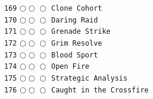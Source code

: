 \documentclass[a4paper,landscape]{article}
\begin{document}
\begin{multicols*}{5}
\texttt{169} \(\bigcirc\!\bigcirc\!\bigcirc\)  \texttt{Clone Cohort} \vspace{-0.3mm}\\ 
\texttt{170} \(\bigcirc\!\bigcirc\!\bigcirc\)  \texttt{Daring Raid} \vspace{-0.3mm}\\ 
\texttt{171} \(\bigcirc\!\bigcirc\!\bigcirc\)  \texttt{Grenade Strike} \vspace{-0.3mm}\\ 
\texttt{172} \(\bigcirc\!\bigcirc\!\bigcirc\)  \texttt{Grim Resolve} \vspace{-0.3mm}\\ 
\texttt{173} \(\bigcirc\!\bigcirc\!\bigcirc\)  \texttt{Blood Sport} \vspace{-0.3mm}\\ 
\texttt{174} \(\bigcirc\!\bigcirc\!\bigcirc\)  \texttt{Open Fire} \vspace{-0.3mm}\\ 
\texttt{175} \(\bigcirc\!\bigcirc\!\bigcirc\)  \texttt{Strategic Analysis} \vspace{-0.3mm}\\ 
\texttt{176} \(\bigcirc\!\bigcirc\!\bigcirc\)  \texttt{Caught in the Crossfire} \vspace{-0.3mm}\\ 

\end{multicols*}
\end{document}
